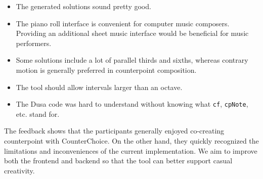 \begin{itemize}
  \item The generated solutions sound pretty good.
  \item The piano roll interface is convenient for computer music composers.
    Providing an additional sheet music interface would be beneficial for
    music performers.
  \item Some solutions include a lot of parallel thirds and sixths, whereas
    contrary motion is generally preferred in counterpoint composition.
  \item The tool should allow intervals larger than an octave.
  \item The Dusa code was hard to understand without knowing what \texttt{cf},
    \texttt{cpNote}, etc. stand for.
\end{itemize}

The feedback shows that the participants generally enjoyed co-creating
counterpoint with CounterChoice.
On the other hand, they quickly recognized the limitations and inconveniences
of the current implementation.
We aim to improve both the frontend and backend so that the tool can better
support casual creativity.


